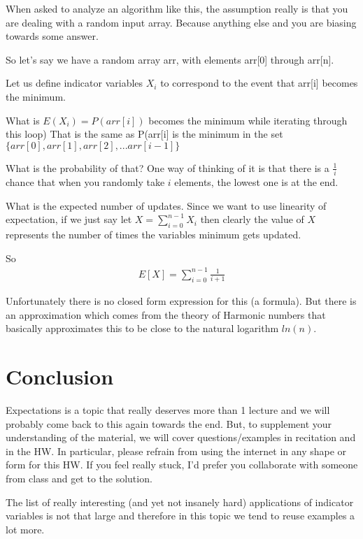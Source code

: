 \documentclass[12pt]{article}
\begin{document}
When asked to analyze an algorithm like this, the assumption really is that you are dealing with a random input array. Because anything else and you are biasing towards some answer.

So let's say we have a random array arr, with elements arr[0] through arr[n].

Let us define indicator variables $X_i$ to correspond to the event that arr[i] becomes the minimum. 

What is $E(X_i) = P(arr[i])$ becomes the minimum while iterating through this loop)
That is the same as P(arr[i] is the minimum in the set 
$\{arr[0], arr[1], arr[2],...arr[i-1]\}$
 
What is the probability of that? One way of thinking of it is that there is a $\frac{1}{i}$ chance that when you randomly take $i$ elements, the lowest one is at the end. 

What is the expected number of updates. Since we want to use linearity of expectation, if we 
just say let $\displaystyle X = \sum_{i=0}^{n-1}X_i$ then clearly the value of $X$ represents the number of times the variables minimum gets updated.

So
\begin{align*}
E[X] = \sum_{i=0}^{n-1} \frac{1}{i+1} 
\end{align*} 

Unfortunately there is no closed form expression for this (a formula). But there is an approximation which comes from the theory of Harmonic numbers that basically approximates this to be close to the natural logarithm $ln(n)$.

\section*{Conclusion}
Expectations is a topic that really deserves more than 1 lecture and we will probably come back to this again towards the end. But, to supplement your understanding of the material, we will cover questions/examples in recitation and in the HW. In particular, please refrain from using the internet in any shape or form for this HW. If you feel really stuck, I'd prefer you collaborate with someone from class and get to the solution. 

The list of really interesting (and yet not insanely hard) applications of indicator variables is not that large and therefore in this topic we tend to reuse examples a lot more. 
\end{document}

